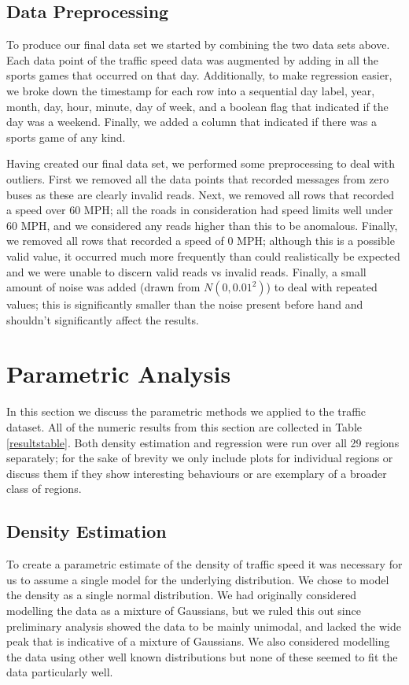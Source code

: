 \documentclass[12pt]{article}
\begin{document}
\subsection{Data Preprocessing}
To produce our final data set we started by combining the two data sets above. Each data point of the traffic speed data was augmented by adding in all the sports games that occurred on that day. Additionally, to make regression easier, we broke down the timestamp for each row into a sequential day label, year, month, day, hour, minute, day of week, and a boolean flag that indicated if the day was a weekend. Finally, we added a column that indicated if there was a sports game of any kind.

Having created our final data set, we performed some preprocessing to deal with outliers. First we removed all the data points that recorded messages from zero buses as these are clearly invalid reads. Next, we removed all rows that recorded a speed over 60 MPH; all the roads in consideration had speed limits well under 60 MPH, and we considered any reads higher than this to be anomalous. Finally, we removed all rows that recorded a speed of 0 MPH; although this is a possible valid value, it occurred much more frequently than could realistically be expected and we were unable to discern valid reads vs invalid reads. Finally, a small amount of noise was added (drawn from $N(0, 0.01^2)$) to deal with repeated values; this is significantly smaller than the noise present before hand and shouldn't significantly affect the results.
\section{Parametric Analysis}
In this section we discuss the parametric methods we applied to the traffic dataset. All of the numeric results from this section are collected in Table \ref{resultstable}. Both density estimation and regression were run over all 29 regions separately; for the sake of brevity we only include plots for individual regions or discuss them if they show interesting behaviours or are exemplary of a broader class of regions.
\subsection{Density Estimation}
To create a parametric estimate of the density of traffic speed it was necessary for us to assume a single model for the underlying distribution. We chose to model the density as a single normal distribution. We had originally considered modelling the data as a mixture of Gaussians, but we ruled this out since preliminary analysis showed the data to be mainly unimodal, and lacked the wide peak that is indicative of a mixture of Gaussians. We also considered modelling the data using other well known distributions but none of these seemed to fit the data particularly well.
\end{document}
